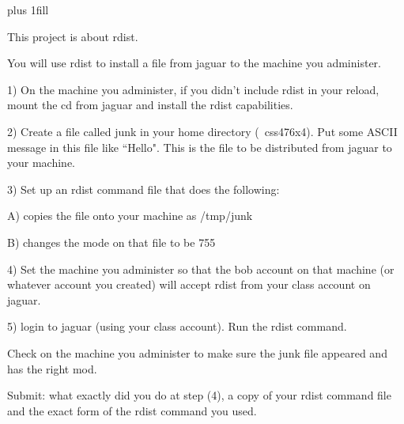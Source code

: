 
\rightskip=0pt plus 1fill

\parindent 0pt

This project is about rdist.

You will use rdist to install a file from {\ltt{}jaguar} to the machine 
you administer.

1) On the machine you administer, if you didn't include rdist in your reload,
mount the cd from {\ltt{}jaguar} and install the rdist capabilities.

2) Create a file called {\ltt{}junk} in your home directory ({\ltt{}~css476x4}).
Put some ASCII message in this file like ``Hello".
This is the file to be distributed from {\ltt{}jaguar} to your machine.

3) Set up an rdist command file that does the following:

A) copies the file onto your machine as {\ltt{}/tmp/junk}

B) changes the mode on that file to be {\ltt{}755}

4) Set the machine you administer so that the {\ltt{}bob} account on that
machine (or whatever account you created) will accept rdist from your
class account on {\ltt{}jaguar}.

5) login to {\ltt{}jaguar} (using your class account).
Run the rdist command.

Check on the machine you administer to make sure the junk file appeared
and has the right mod.

Submit: what exactly did you do at step (4),
a copy of your rdist command file and
the exact form of the rdist command you used.
\bye
